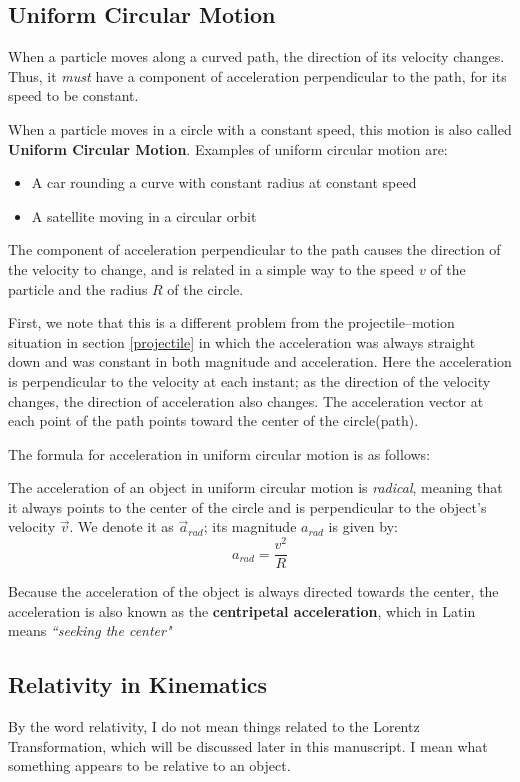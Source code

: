 \subsection{Uniform Circular Motion}
When a particle moves along a curved path, the direction of its velocity changes. Thus, it \emph{must} have a component of acceleration perpendicular to the path, for its speed to be constant.

When a particle moves in a circle with a constant speed, this motion is also called \textbf{Uniform Circular Motion}.
Examples of uniform circular motion are:
\begin{itemize}
\item A car rounding a curve with constant radius at constant speed
\item A satellite moving in a circular orbit
\end{itemize}

The component of acceleration perpendicular to the path causes the direction of the velocity to change, and is related in a simple way to the speed $v$ of the particle and the radius $R$ of the circle.

First, we note that this is a different problem from the projectile--motion situation in section \ref{projectile} in which the acceleration was always straight down and was constant in both magnitude and acceleration. Here the acceleration is perpendicular to the velocity at each instant; as the direction of the velocity changes, the direction of acceleration also changes. The acceleration vector at each point of the path points toward the center of the circle(path).

The formula for acceleration in uniform circular motion is as follows:
\begin{form}
The acceleration of an object in uniform circular motion is \emph{radical}, meaning that it always points to the center of the circle and is perpendicular to the object's velocity $\vec{v}$. We denote it as $\vec{a}_{rad}$; its magnitude $a_{rad}$ is given by:
$$ a_{rad} = \frac{v^2}{R}$$
\end{form}

Because the acceleration of the object is always directed towards the center, the acceleration is also known as the \textbf{centripetal acceleration}, which in Latin means \emph{``seeking the center"}

\subsection{Relativity in Kinematics}
By the word relativity, I do not mean things related to the Lorentz Transformation, which will be discussed later in this manuscript. I mean what something appears to be relative to an object. 

